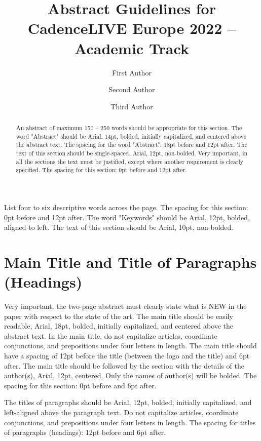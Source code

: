 \documentclass[a4paper,10pt]{article}
\title {Abstract Guidelines for CadenceLIVE Europe 2022 -- Academic Track}
\author[*]{First Author}
\author[**]{Second Author}
\author[***]{Third Author}
\affil[*]{company, address, town, country}
\affil[**]{company, address, town, country}
\affil[***]{company, address, town, country}
\begin{document}
\maketitle

\begin{abstract}
An abstract of maximum 150 – 250 words should be appropriate for this section.
The word "Abstract" should be Arial, 14pt, bolded, initially capitalized, and
centered above the abstract text. The spacing for the word "Abstract": 18pt
before and 12pt after. The text of this section should be single-spaced, Arial,
12pt, non-bolded. Very important, in all the sections the text must be
justified, except where another requirement is clearly specified. The spacing
for this section: 0pt before and 12pt after. 
\end{abstract}

\begin{keywords}
List four to six descriptive words across the page. The spacing for this
section: 0pt before and 12pt after. The word "Keywords" should be Arial, 12pt,
bolded, aligned to left. The text of this section should be Arial, 10pt,
non-bolded.
\end{keywords}

\section*{Main Title and Title of Paragraphs (Headings)}

Very important, the two-page abstract must clearly state what is NEW in the
paper with respect to the state of the art. The main title should be easily
readable, Arial, 18pt, bolded, initially capitalized, and centered above the
abstract text. In the main title, do not capitalize articles, coordinate
conjunctions, and prepositions under four letters in length. The main title
should have a spacing of 12pt before the title (between the logo and the title)
and 6pt after. The main title should be followed by the section with the
details of the author(s), Arial, 12pt, centered. Only the names of author(s)
will be bolded. The spacing for this section: 0pt before and 6pt after. 

The titles of paragraphs should be Arial, 12pt, bolded, initially capitalized,
and left-aligned above the paragraph text. Do not capitalize articles,
coordinate conjunctions, and prepositions under four letters in length. The
spacing for titles of paragraphs (headings): 12pt before and 6pt after. 
\end{document}
